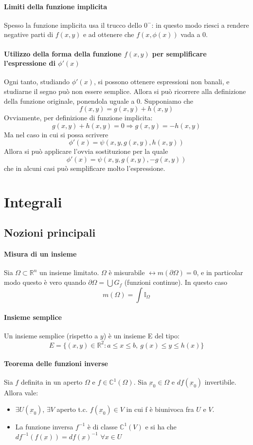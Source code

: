 \documentclass[a4paper,12pt]{article}
\begin{document}
\paragraph{Limiti della funzione implicita}
Spesso la funzione implicita usa il trucco dello $0^-$: in questo modo riesci a rendere negative parti di $f(x,y)$ e ad ottenere che $f(x,\phi(x))$ vada a 0.
\paragraph{Utilizzo della forma della funzione $f(x, y)$ per semplificare l'espressione di $\phi'(x)$}
Ogni tanto, studiando $\phi'(x)$, si possono ottenere espressioni non banali, e studiarne il segno può non essere semplice. Allora si può ricorrere alla definizione della funzione originale, ponendola uguale a 0. Supponiamo che
$$ f(x,y) = g(x,y)+h(x,y) $$
Ovviamente, per definizione di funzione implicita:
$$ g(x,y)+h(x,y) = 0 \Rightarrow g(x, y) = -h(x,y)$$
Ma nel caso in cui si possa scrivere
$$ \phi'(x) = \psi(x, y, g(x,y), h(x, y))$$
Allora si può applicare l'ovvia sostituzione per la quale
$$ \phi'(x) = \psi(x, y, g(x,y), -g(x, y))$$
che in alcuni casi può semplificare molto l'espressione.

\section{Integrali}
\subsection{Nozioni principali}
\paragraph{Misura di un insieme}
Sia $\Omega \subset \mathbb{R}^n$ un insieme limitato. $\Omega$ è misurabile $\leftrightarrow m(\partial\Omega) = 0$, e in particolar modo questo è vero quando $\partial\Omega = \bigcup G_f$ (funzioni continue).
In questo caso
$$m(\Omega) = \int \mathbb{I}_\Omega$$
\paragraph{Insieme semplice}
Un insieme semplice (rispetto a $y$) è un insieme E del tipo:
$$ E = \{(x, y) \in \mathbb{R}^2 : a\leq x\leq b,\ g(x)\leq y\leq h(x) \} $$

\paragraph{Teorema delle funzioni inverse}
Sia $f$ definita in un aperto $\Omega$ e $f\in \mathbb{C}^1(\Omega)$. Sia $\underbar{x}_0 \in \Omega$ e $df(\underbar{x}_0)$ invertibile. Allora vale:
\begin{itemize}
 \item $\exists U(\underbar{x}_0)$, $\exists V$ aperto t.c. $f(\underbar{x}_0)\in V$ in cui f è biunivoca fra $U$ e $V$.
 \item La funzione inversa $f^{-1}$ è di classe $\mathbb{C}^1(V)$ e si ha che $df^{-1}(f(\underbar{x})) = df(\underbar{x})^{-1}$ $\forall x \in U$
\end{itemize}
\end{document}

